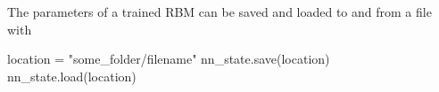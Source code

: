 \documentclass[submission, Phys]{SciPost}
\begin{document}
%

%


The parameters of a trained RBM can be saved and loaded to and from a file with

\begin{python}
	location = "some_folder/filename"
	nn_state.save(location)
	nn_state.load(location)
\end{python}

\end{document}
